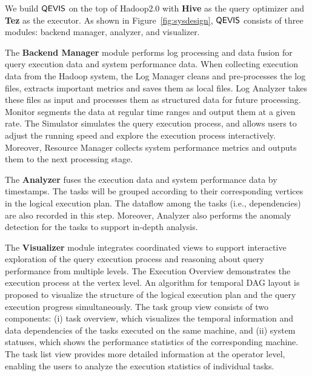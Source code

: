We build $\mathsf{QEVIS}$ on the top of Hadoop2.0 with \textbf{Hive} as the query optimizer and \textbf{Tez} as the executor. As shown in Figure~\ref{fig:sysdesign}, $\mathsf{QEVIS}$ consists of three modules: backend manager, analyzer, and visualizer. 


The \textbf{Backend Manager} module performs log processing and data fusion for query execution data and system performance data. When collecting execution data from the Hadoop system, the Log Manager cleans and pre-processes the log files, extracts important metrics and saves them as local files.
Log Analyzer takes these files as input and processes them as structured data for future processing.
Monitor segments the data at regular time ranges and output them at a given rate.
The Simulator simulates the query execution process, and allows users to adjust the running speed and explore the execution process interactively.
Moreover, Resource Manager collects system performance metrics and outputs them to the next processing stage.


The \textbf{Analyzer} fuses the execution data and system performance data by timestamps. The tasks will be grouped according to their corresponding vertices in the logical execution plan. The dataflow among the tasks (i.e., dependencies) are also recorded in this step. Moreover, Analyzer also performs the anomaly detection for the tasks to support in-depth analysis.


The \textbf{Visualizer} module integrates coordinated views to support interactive exploration of the query execution process and reasoning about query performance from multiple levels. The Execution Overview demonstrates the execution process at the vertex level. An algorithm for temporal DAG layout is proposed to visualize the structure of the logical execution plan and the query execution progress simultaneously. The task group view consists of two components: (i) task overview, which
visualizes the temporal information and data dependencies of the tasks executed on the same machine, and (ii) system statuses, which shows the performance statistics of the corresponding machine. The task list view provides more detailed information at the operator level, enabling the users to analyze the execution statistics of individual tasks.  

